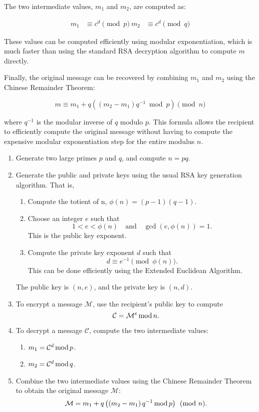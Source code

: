 \documentclass[12pt,openany]{book}
\theoremstyle{definition}
\newcommand{\inv}[1]{#1^{-1}}
\newcommand{\of}[1]{\left( #1 \right)}
\renewcommand{\mod}{\operatorname{\textnormal{mod}}}
\begin{document}
	The two intermediate values, $m_1$ and $m_2$, are computed as:
	
	$$\begin{aligned} m_1 &\equiv c^d \pmod{p}\ m_2 &\equiv c^d \pmod{q}\end{aligned}$$
	
	These values can be computed efficiently using modular exponentiation, which is much faster than using the standard RSA decryption algorithm to compute $m$ directly.
	
	Finally, the original message can be recovered by combining $m_1$ and $m_2$ using the Chinese Remainder Theorem:
	
	$$m \equiv m_1 + q((m_2 - m_1)q^{-1} \bmod p) \pmod n$$
	
	where $q^{-1}$ is the modular inverse of $q$ modulo $p$. This formula allows the recipient to efficiently compute the original message without having to compute the expensive modular exponentiation step for the entire modulus $n$.
	
	\begin{tcolorbox}[colback=white!10!white,colframe=blue!50!black,title=RSA-CRT Algorithm]
		\begin{enumerate}
			\item Generate two large primes $p$ and $q$, and compute $n = pq$.
			\item Generate the public and private keys using the usual RSA key generation algorithm. That is, \begin{enumerate}
				\item Compute the totient of n, $\phi(n) = (p - 1)(q - 1)$.
				\item Choose an integer $e$ such that \[
				1 < e < \phi(n)\quad \text{and}\quad \gcd(e, \phi(n)) = 1.
				\] This is the public key exponent.
				\item Compute the private key exponent $d$ such that \[
				d\equiv\inv{e} \pmod{\phi(n)}.
				\] This can be done efficiently using the Extended Euclidean Algorithm.
			\end{enumerate}
			The public key is $(n, e)$, and the private key is $(n, d)$.
			\item To encrypt a message $\mathcal{M}$, use the recipient's public key to compute \[
			\mathcal{C} = \mathcal{M}^e \mod{n}.
			\]
			\item To decrypt a message $\mathcal{C}$, compute the two intermediate values: \begin{enumerate}
				\item $m_1 = \mathcal{C}^d \mod p$.
				\item $m_2 = \mathcal{C}^d \mod q$.
			\end{enumerate}
			\item Combine the two intermediate values using the Chinese Remainder Theorem to obtain the original message $\mathcal{M}$: \[
			\mathcal{M} = m_1+q\of{\of{m_2-m_1}\inv{q}\mod p}\pmod{n}.
			\]
		\end{enumerate}
	\end{tcolorbox}
	
\end{document}
